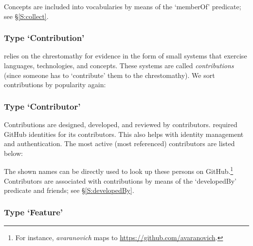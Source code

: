 

\noindent
Concepts are included into vocabularies by means of the `memberOf'
predicate; see \S\ref{S:collect}.


\subsubsection{Type `Contribution'}

\solasote{} relies on the chrestomathy \ooo{} for evidence in the form
of small systems that exercise languages, technologies, and
concepts. These systems are called \emph{contributions} (since someone
has to `contribute' them to the chrestomathy). We sort contributions by
popularity again:




\subsubsection{Type `Contributor'}

Contributions are designed, developed, and reviewed by
contributors. \ooo{} required GitHub identities for its
contributors. This also helps with identity management and
authentication. The most active (most referenced) contributors are
listed below:



\noindent
The shown names can be directly used to look up these persons on
GitHub.\footnote{For instance, \emph{avaranovich} maps to
  \url{https://github.com/avaranovich}.}  Contributors are associated
with contributions by means of the `developedBy' predicate and
friends; see \S\ref{S:developedBy}.


\subsubsection{Type `Feature'}

